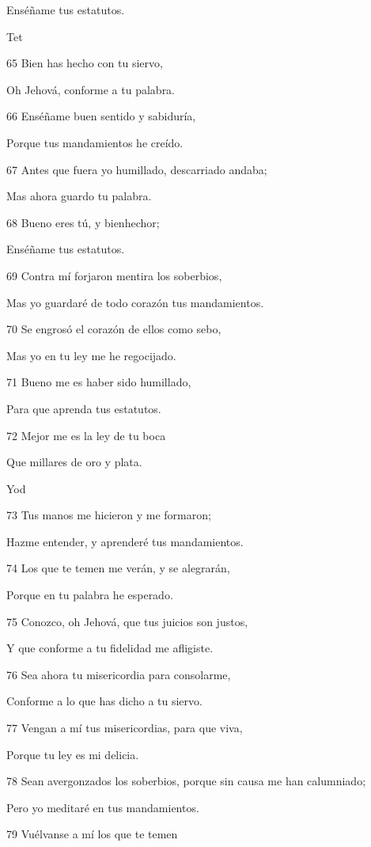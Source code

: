 \par Enséñame tus estatutos.
\par Tet
\par 65 Bien has hecho con tu siervo,
\par Oh Jehová, conforme a tu palabra.
\par 66 Enséñame buen sentido y sabiduría,
\par Porque tus mandamientos he creído.
\par 67 Antes que fuera yo humillado, descarriado andaba;
\par Mas ahora guardo tu palabra.
\par 68 Bueno eres tú, y bienhechor;
\par Enséñame tus estatutos.
\par 69 Contra mí forjaron mentira los soberbios,
\par Mas yo guardaré de todo corazón tus mandamientos.
\par 70 Se engrosó el corazón de ellos como sebo,
\par Mas yo en tu ley me he regocijado.
\par 71 Bueno me es haber sido humillado,
\par Para que aprenda tus estatutos.
\par 72 Mejor me es la ley de tu boca
\par Que millares de oro y plata.
\par Yod
\par 73 Tus manos me hicieron y me formaron;
\par Hazme entender, y aprenderé tus mandamientos.
\par 74 Los que te temen me verán, y se alegrarán,
\par Porque en tu palabra he esperado.
\par 75 Conozco, oh Jehová, que tus juicios son justos,
\par Y que conforme a tu fidelidad me afligiste.
\par 76 Sea ahora tu misericordia para consolarme,
\par Conforme a lo que has dicho a tu siervo.
\par 77 Vengan a mí tus misericordias, para que viva,
\par Porque tu ley es mi delicia.
\par 78 Sean avergonzados los soberbios, porque sin causa me han calumniado;
\par Pero yo meditaré en tus mandamientos.
\par 79 Vuélvanse a mí los que te temen
